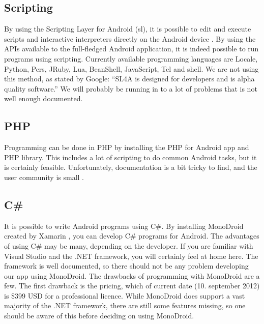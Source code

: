\subsection{Scripting}
By using the Scripting Layer for Android (\gls{sl}), it is possible to edit and execute scripts and interactive interpreters directly on the Android device \cite{bib:slfa}. By using the APIs available to the full-fledged Android application, it is indeed possible to run programs using scripting. Currently available programming languages are Locale, Python, Pers, JRuby, Lua, BeanShell, JavaScript, Tcl and shell. We are not using this method, as stated by Google: “SL4A is designed for developers and is alpha quality software.” We will probably be running in to a lot of problems that is not well enough documented.

\subsection{PHP}
Programming can be done in PHP by installing the PHP for Android app and PHP library. This includes a lot of scripting to do common Android tasks, but it is certainly feasible. Unfortunately, documentation is a bit tricky to find, and the user community is small \cite{bib:php}.

\subsection{C\#}
It is possible to write Android programs using C\#. By installing MonoDroid created by Xamarin \cite{bib:mbx}, you can develop C\# programs for Android. The advantages of using C\# may be many, depending on the developer. If you are familiar with Visual Studio and the .NET framework, you will certainly feel at home here. The framework is well documented, so there should not be any problem developing our app using MonoDroid.
\newline
\newline
The drawbacks of programming with MonoDroid are a few. The first drawback is the pricing, which of current date (10. september 2012) is \$399 USD for a professional licence. While MonoDroid does support a vast majority of the .NET framework, there are still some features missing, so one should be aware of this before deciding on using MonoDroid.

